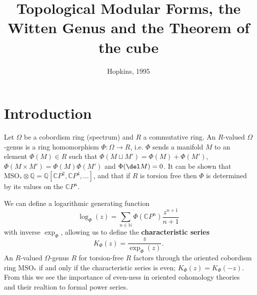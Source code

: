 \title{Topological Modular Forms, the Witten Genus and the Theorem of the cube}
\author{Hopkins, 1995}
\usepackage{amsmath,amsthm}




\section*{Introduction}
Let $\Omega$ be a cobordism ring (spectrum) and $R$ a commutative ring. An $R$-valued $\Omega$-genus is a ring homomorphism $\Phi : \Omega \to R$, i.e. $\Phi$ sends a manifold $M$ to an element $\Phi(M) \in R$ such that $\Phi(M \sqcup M') = \Phi(M) + \Phi(M')$, $\Phi(M \times M') = \Phi(M)\Phi(M')$ and $\Phi(\del M)= 0$. It can be shown that $\text{MSO}_\ast \otimes \mathbb{Q} = \mathbb{Q}[\mathbb{C}P^2, \mathbb{C}P^4, \dots]$, and that if $R$ is torsion free then $\Phi$ is determined by its values on the $\mathbb{C}P^n$. 

We can define a logarithmic generating function 
	\[
	\log_\Phi(z) = \sum_{n\in\mathbb{N}} \Phi(\mathbb{C}P^n) \frac{z^{n+1}}{n+1}
	\]
with inverse $\exp_\Phi$, allowing us to define the \textbf{characteristic series}
	\[
	K_\Phi(z) = \frac{z}{\exp_\Phi(z)}.
	\]
	An $R$-valued $\Omega$-genus $R$ for torsion-free $R$ factors through the oriented cobordism ring $\text{MSO}_\ast$ if and only if the characteristic series is even; $K_\Phi(z) = K_\Phi(-z)$. From this we see the importance of even-ness in oriented cohomology theories and their realtion to formal power series.






